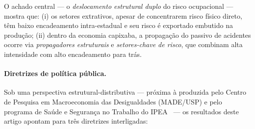 \documentclass[12pt, a4paper]{article}
\begin{document}
O achado central --- o \textit{deslocamento estrutural duplo} do risco
ocupacional --- mostra que: (i) os setores extrativos, apesar de
concentrarem risco físico direto, têm baixo encadeamento intra-estadual
e seu risco é exportado embutido na produção; (ii) dentro da economia
capixaba, a propagação do passivo de acidentes ocorre via
\textit{propagadores estruturais} e \textit{setores-chave de risco},
que combinam alta intensidade com alto encadeamento para trás.

\paragraph{Diretrizes de política pública.}
Sob uma perspectiva estrutural-distributiva --- próxima à produzida
pelo Centro de Pesquisa em Macroeconomia das Desigualdades (MADE/USP)
e pelo programa de Saúde e Segurança no Trabalho do
IPEA~\citep{chagas2011saude} --- os resultados deste artigo apontam
para três diretrizes interligadas:
\end{document}

